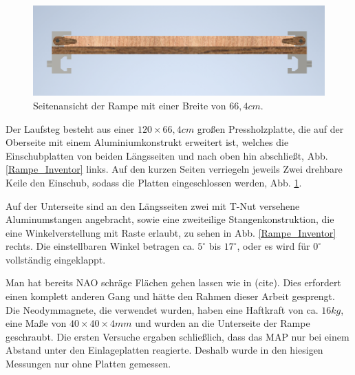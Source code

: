 \begin{figure}
	\vspace{-0.5cm}
	\centering
	\includegraphics[width=\linewidth]{Bilder/Rampe_Seitenansicht3.png}
	\caption{Seitenansicht der Rampe mit einer Breite von $66,4 \unit{cm}$.}
	\label{Rampe_Seite_Inventor}
	\vspace{-0.5cm}
\end{figure}
Der Laufsteg besteht aus einer $120\times66,4 \unit{cm}$ großen Pressholzplatte, die auf der Oberseite mit einem Aluminiumkonstrukt erweitert ist, welches die Einschubplatten von beiden Längsseiten und nach oben hin abschließt, Abb. \ref{Rampe_Inventor} links. Auf den kurzen Seiten verriegeln jeweils Zwei drehbare Keile den Einschub, sodass die Platten eingeschlossen werden, Abb. \ref{Rampe_Seite_Inventor}.

Auf der Unterseite sind an den Längsseiten zwei mit T-Nut versehene Aluminumstangen angebracht, sowie eine zweiteilige Stangenkonstruktion, die eine Winkelverstellung mit Raste erlaubt, zu sehen in Abb. \ref{Rampe_Inventor} rechts. Die einstellbaren Winkel betragen ca. $5^\circ$ bis $17^\circ$, oder es wird für $0^\circ$ vollständig eingeklappt.
  

Man hat bereits NAO schräge Flächen gehen lassen wie in (cite). Dies erfordert einen komplett anderen Gang und hätte den Rahmen dieser Arbeit gesprengt. Die Neodymmagnete, die verwendet wurden, haben eine Haftkraft von ca. $16 \unit{kg}$, eine Maße von $40\times40\times4 \unit{mm}$ \cite{schraubmagnet} und wurden an die Unterseite der Rampe geschraubt. Die ersten Versuche ergaben schließlich, dass das MAP nur bei einem Abstand unter den Einlageplatten reagierte. Deshalb wurde in den hiesigen Messungen nur ohne Platten gemessen.




